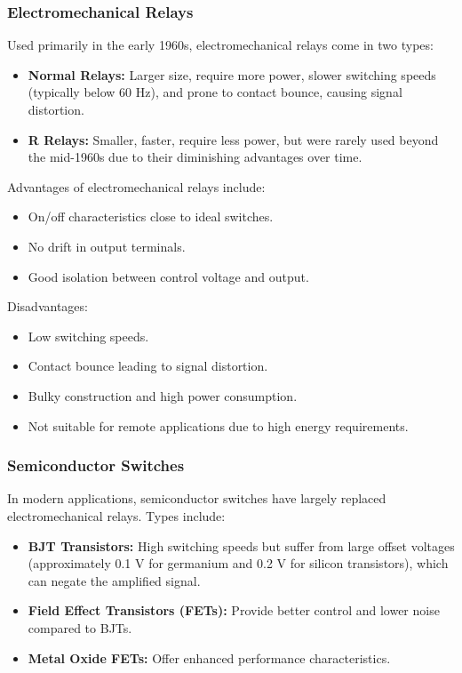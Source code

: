 \subsubsection{Electromechanical Relays}
Used primarily in the early 1960s, electromechanical relays come in two types:
\begin{itemize}
    \item \textbf{Normal Relays:} Larger size, require more power, slower switching speeds (typically below 60 Hz), and prone to contact bounce, causing signal distortion.
    \item \textbf{R Relays:} Smaller, faster, require less power, but were rarely used beyond the mid-1960s due to their diminishing advantages over time.
\end{itemize}
Advantages of electromechanical relays include:
\begin{itemize}
    \item On/off characteristics close to ideal switches.
    \item No drift in output terminals.
    \item Good isolation between control voltage and output.
\end{itemize}
Disadvantages:
\begin{itemize}
    \item Low switching speeds.
    \item Contact bounce leading to signal distortion.
    \item Bulky construction and high power consumption.
    \item Not suitable for remote applications due to high energy requirements.
\end{itemize}

\subsubsection{Semiconductor Switches}
In modern applications, semiconductor switches have largely replaced electromechanical relays. Types include:
\begin{itemize}
    \item \textbf{BJT Transistors:} High switching speeds but suffer from large offset voltages (approximately 0.1 V for germanium and 0.2 V for silicon transistors), which can negate the amplified signal.
    \item \textbf{Field Effect Transistors (FETs):} Provide better control and lower noise compared to BJTs.
    \item \textbf{Metal Oxide FETs:} Offer enhanced performance characteristics.
\end{itemize}
